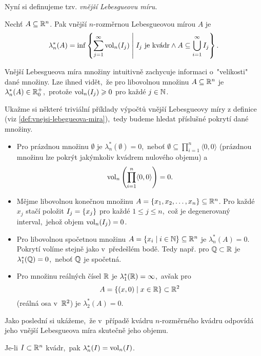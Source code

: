 Nyní si definujeme tzv. \emph{vnější Lebesgueovu míru}.
\begin{definition}\label{def:vnejsi-lebegueova-mira}
    Nechť $A\subseteq\mathbb{R}^n$. Pak vnější $n$-rozměr\-nou Lebesgueovou mírou $A$ je
    \[\lambda_n^*(A)=\inf\left\{\sum_{j=1}^{\infty}\operatorname{vol}_n(I_j)\;\middle|\;\text{$I_j$ je kvádr}\land A\subseteq\bigcup_{i=1}^\infty I_j\right\}.\]
\end{definition}
Vnější Lebesgueova míra množiny intuitivně zachycuje informaci o~"velikosti" dané množiny.  Lze ihned vidět,~že pro libovolnou množinu $A\subseteq\mathbb{R}^n$ je $\lambda_n^*(A)\in\mathbb{R}_0^+$,~protože $\operatorname{vol}_n(I_j)\geqslant0$ pro každé $j\in\mathbb{N}$.
\begin{example}\label{ex:lebegueova-mira-trivialni-priklady}
    Ukažme si některé triviální příklady výpočtů vnější Lebesgueovy míry z definice (viz \ref{def:vnejsi-lebegueova-mira}),~tedy budeme hledat příslušné pokrytí dané množiny.
    \begin{itemize}
        \item Pro prázdnou množinu $\emptyset$ je $\lambda_n^*(\emptyset)=0$,~neboť $\emptyset\subseteq\prod_{i=1}^{n}\langle0,0\rangle$ (prázdnou množinu lze pokrýt jakýmkoliv kvádrem nulového objemu) a
        \[\operatorname{vol}_n\left(\prod_{i=1}^{n}\langle0,0\rangle\right)=0.\]
        \item Mějme libovolnou konečnou množinu $A=\left\{x_1,x_2,\dots,x_n\right\}\subseteq\mathbb{R}^n$. Pro každé $x_j$ stačí položit $I_j=\left\{x_j\right\}$ pro každé $1\leqslant j\leqslant n$,~což je degenerovaný interval,~jehož objem $\operatorname{vol}_n(I_j)=0$.
        \item Pro libovolnou spočetnou množinu $A=\left\{x_i\mid i\in\mathbb{N}\right\}\subseteq\mathbb{R}^n$ je $\lambda_n^*(A)=0$. Pokrytí volíme stejně jako v~předešlém bodě. Tedy např. pro $\mathbb{Q}\subset\mathbb{R}$ je $\lambda_1^*(\mathbb{Q})=0$,~neboť $\mathbb{Q}$ je spočetná.
        \item Pro množinu reálných čísel $\mathbb{R}$ je $\lambda_1^*(\mathbb{R})=\infty$,~avšak pro 
        \[A=\left\{(x,0)\mid x\in\mathbb{R}\right\}\subset\mathbb{R}^2\]
        (reálná osa v~$\mathbb{R}^2$) je $\lambda_2^*(A)=0$.
    \end{itemize}
\end{example}
Jako poslední si ukážeme,~že v~případě kvádru $n$-rozměrného kvádru odpovídá jeho vnější Lebesgueova míra skutečně jeho objemu.
\begin{proposition}\label{prop:lebegueova-mira-objem-kvadru}
    Je-li $I\subset\mathbb{R}^n$ kvádr,~pak $\lambda_n^*(I)=\operatorname{vol}_n(I)$.
\end{proposition}
